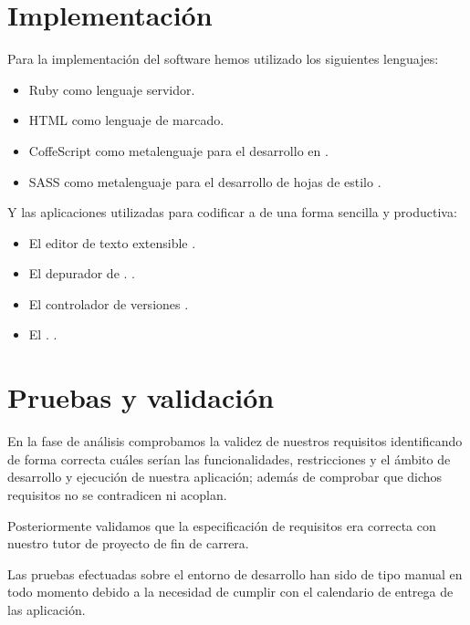\newpage

\clearpage
\section{Implementación}
Para la implementación del software hemos utilizado los siguientes lenguajes:

\begin{itemize}
\item Ruby como lenguaje servidor.
\item HTML como lenguaje de marcado.
\item CoffeScript como metalenguaje para el desarrollo en \cite{lang:coffescript}.
\item SASS como metalenguaje para el desarrollo de hojas de estilo \cite{lang:sass}.
\end{itemize}

Y las aplicaciones utilizadas para codificar a de una forma sencilla y
productiva:

\begin{itemize}
\item El editor de texto extensible  \cite{prog:sublimetext2}.
\item El depurador de  \cite{prog:firefox} .
  \cite{prog:firebug}.
\item El controlador de versiones  \cite{wiki:GIT}.
\item El  .
  \cite{prog:twitter_bootstrap}.
\end{itemize}

\section{Pruebas y validación}
En la fase de análisis comprobamos la validez de nuestros requisitos
identificando de forma correcta cuáles serían las funcionalidades, restricciones
y el ámbito de desarrollo y ejecución de nuestra aplicación; además de comprobar
que dichos requisitos no se contradicen ni acoplan.

Posteriormente validamos que la especificación de requisitos era correcta con
nuestro tutor de proyecto de fin de carrera.

Las pruebas efectuadas sobre el entorno de desarrollo han sido de tipo manual en
todo momento debido a la necesidad de cumplir con el calendario de entrega de
las aplicación.

